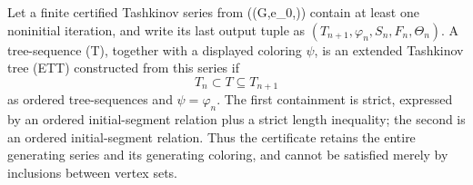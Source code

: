 \begin{definition}
Let a finite certified Tashkinov series from ((G,e_0,\varphi)) contain at
least one noninitial iteration, and write its last output tuple as
\((T_{n+1},\varphi_n,S_n,F_n,\Theta_n)\).  A tree-sequence (T), together
with a displayed coloring \(\psi\), is an extended Tashkinov tree (ETT)
constructed from this series if
\[
                    T_n\subset T\subseteq T_{n+1}
\]
as ordered tree-sequences and \(\psi=\varphi_n\).  The first containment is
strict, expressed by an ordered initial-segment relation plus a strict
length inequality; the second is an ordered initial-segment relation.
Thus the certificate retains the entire generating series and its generating
coloring, and cannot be satisfied merely by inclusions between vertex sets.
\end{definition}
